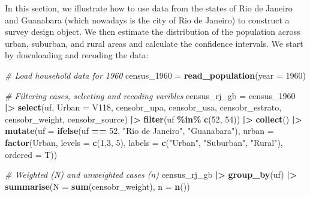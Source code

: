 \documentclass[
]{article}
\newenvironment{Shaded}{\begin{snugshade}}{\end{snugshade}}
\newcommand{\AttributeTok}[1]{\textcolor[rgb]{0.13,0.29,0.53}{#1}}
\newcommand{\CommentTok}[1]{\textcolor[rgb]{0.56,0.35,0.01}{\textit{#1}}}
\newcommand{\DecValTok}[1]{\textcolor[rgb]{0.00,0.00,0.81}{#1}}
\newcommand{\FunctionTok}[1]{\textcolor[rgb]{0.13,0.29,0.53}{\textbf{#1}}}
\newcommand{\NormalTok}[1]{#1}
\newcommand{\OtherTok}[1]{\textcolor[rgb]{0.56,0.35,0.01}{#1}}
\newcommand{\SpecialCharTok}[1]{\textcolor[rgb]{0.81,0.36,0.00}{\textbf{#1}}}
\newcommand{\StringTok}[1]{\textcolor[rgb]{0.31,0.60,0.02}{#1}}
\begin{document}
In this section, we illustrate how to use data from the states of Rio de
Janeiro and Guanabara (which nowadays is the city of Rio de Janeiro) to
construct a survey design object. We then estimate the distribution of
the population across urban, suburban, and rural areas and calculate the
confidence intervals. We start by downloading and recoding the data:

\begin{Shaded}
\begin{Highlighting}[]
\CommentTok{\# Load household data for 1960}
\NormalTok{census\_1960 }\OtherTok{=} \FunctionTok{read\_population}\NormalTok{(}\AttributeTok{year =} \DecValTok{1960}\NormalTok{)}

\CommentTok{\# Filtering cases, selecting and recoding varibles}
\NormalTok{census\_rj\_gb }\OtherTok{=}\NormalTok{ census\_1960 }\SpecialCharTok{|\textgreater{}}
        \FunctionTok{select}\NormalTok{(uf, }\AttributeTok{Urban =}\NormalTok{ V118, }
\NormalTok{               censobr\_upa, censobr\_usa, censobr\_estrato, censobr\_weight, }
\NormalTok{               censobr\_source) }\SpecialCharTok{|\textgreater{}}
        \FunctionTok{filter}\NormalTok{(uf }\SpecialCharTok{\%in\%} \FunctionTok{c}\NormalTok{(}\DecValTok{52}\NormalTok{, }\DecValTok{54}\NormalTok{)) }\SpecialCharTok{|\textgreater{}}
        \FunctionTok{collect}\NormalTok{() }\SpecialCharTok{|\textgreater{}}
        \FunctionTok{mutate}\NormalTok{(}\AttributeTok{uf    =} \FunctionTok{ifelse}\NormalTok{(uf }\SpecialCharTok{==} \DecValTok{52}\NormalTok{, }\StringTok{"Rio de Janeiro"}\NormalTok{, }\StringTok{"Guanabara"}\NormalTok{),}
               \AttributeTok{urban =} \FunctionTok{factor}\NormalTok{(Urban, }
                              \AttributeTok{levels =} \FunctionTok{c}\NormalTok{(}\DecValTok{1}\NormalTok{,}\DecValTok{3}\NormalTok{, }\DecValTok{5}\NormalTok{),}
                              \AttributeTok{labels =} \FunctionTok{c}\NormalTok{(}\StringTok{"Urban"}\NormalTok{, }\StringTok{"Suburban"}\NormalTok{, }\StringTok{"Rural"}\NormalTok{), }
                              \AttributeTok{ordered =}\NormalTok{ T))}

\CommentTok{\# Weighted (N) and unweighted cases (n)}
\NormalTok{census\_rj\_gb }\SpecialCharTok{|\textgreater{}}
        \FunctionTok{group\_by}\NormalTok{(uf) }\SpecialCharTok{|\textgreater{}}
        \FunctionTok{summarise}\NormalTok{(}\AttributeTok{N =} \FunctionTok{sum}\NormalTok{(censobr\_weight),}
                  \AttributeTok{n =} \FunctionTok{n}\NormalTok{())}
\end{Highlighting}
\end{Shaded}
\end{document}
